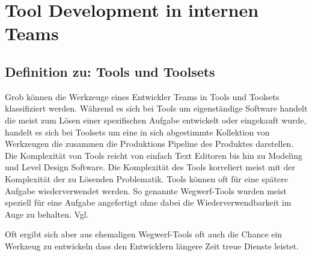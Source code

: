 \documentclass[pagesize, paper=a4, fontsize=12pt,titlepage=true, headings=small, headnosepline, abstractoff, liststotoc, nochapterprefix, plainheadsepline, twoside]{scrreprt}
\begin{document}
\chapter{Tool Development in internen Teams}

\section{Definition zu: Tools und Toolsets}
Grob können die Werkzeuge eines Entwickler Teams in Tools und Toolsets klassifiziert werden. Während es sich bei Tools um eigenständige Software handelt die meist zum Lösen einer spezifischen Aufgabe entwickelt oder eingekauft wurde, handelt es sich bei Toolsets um eine in sich abgestimmte Kollektion von Werkzeugen die zusammen die Produktions Pipeline des Produktes darstellen. Die Komplexität von Tools reicht von einfach Text Editoren bis hin zu Modeling und Level Design Software. Die Komplexität des Tools korreliert meist mit der Komplexität der zu Lösenden Problematik.
Tools können oft für eine spätere Aufgabe wiederverwendet werden. So genannte Wegwerf-Tools wurden meist speziell für eine Aufgabe angefertigt ohne dabei die Wiederverwendbarkeit im Auge zu behalten. Vgl. \autocite[S. 3]{Wihlidal2006}

Oft ergibt sich aber aus ehemaligen Wegwerf-Tools oft auch die Chance ein Werkzeug zu entwickeln dass den Entwicklern längere Zeit treue Dienste leistet.


\end{document}
